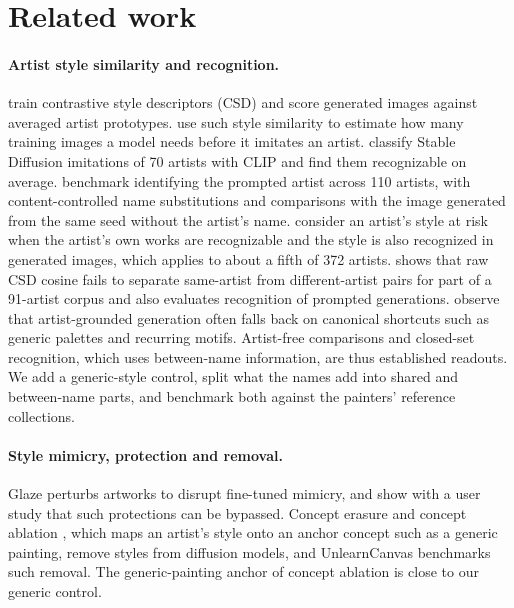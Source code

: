 \documentclass[10pt]{article}
\begin{document}
\section{Related work}\label{sec:related}

\paragraph{Artist style similarity and recognition.}
\citet{somepalli2024style} train contrastive style descriptors (CSD) and score generated images
against averaged artist prototypes. \citet{verma2025imitation} use such style similarity to
estimate how many training images a model needs before it imitates an artist.
\citet{casper2023measuring} classify Stable Diffusion imitations of 70 artists with CLIP and find
them recognizable on average. \citet{su2025prompted} benchmark identifying the prompted artist
across 110 artists, with content-controlled name substitutions and comparisons with the image
generated from the same seed without the artist's name. \citet{moayeri2025rethinking} consider an
artist's style at risk when the artist's own works are recognizable and the style is also
recognized in generated images, which applies to about a fifth of 372 artists.
\citet{frochte2026csd} shows that raw CSD cosine fails to separate same-artist from
different-artist pairs for part of a 91-artist corpus and also evaluates recognition of prompted
generations. \citet{xing2026beyond} observe that artist-grounded generation often falls back on
canonical shortcuts such as generic palettes and recurring motifs. Artist-free comparisons and
closed-set recognition, which uses between-name information, are thus established readouts. We add
a generic-style control, split what the names add into shared and between-name parts, and
benchmark both against the painters' reference collections.

\paragraph{Style mimicry, protection and removal.}
Glaze \citep{shan2023glaze} perturbs artworks to disrupt fine-tuned mimicry, and
\citet{honig2025adversarial} show with a user study that such protections can be bypassed.
Concept erasure \citep{gandikota2023erasing} and concept ablation \citep{kumari2023ablating},
which maps an artist's style onto an anchor concept such as a generic painting, remove styles
from diffusion models, and UnlearnCanvas \citep{zhang2024unlearncanvas} benchmarks such removal.
The generic-painting anchor of concept ablation is close to our generic control.
\end{document}
